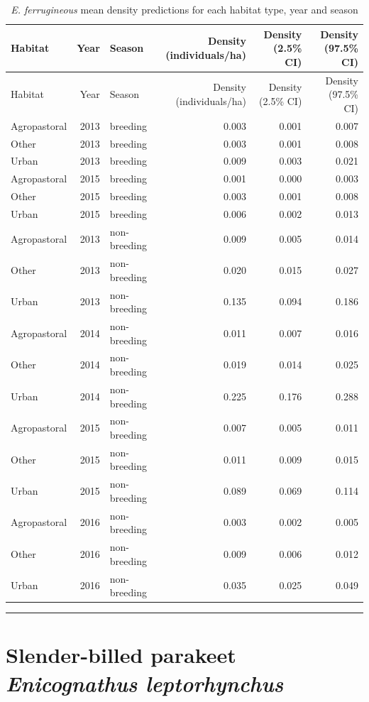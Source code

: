 \documentclass[]{article}
\begin{document}
\begin{longtable}[]{@{}lrlrrr@{}}
\caption{\textit{E. ferrugineous} mean density predictions for each
habitat type, year and season}\tabularnewline
\toprule
Habitat & Year & Season & Density (individuals/ha) & Density (2.5\% CI)
& Density (97.5\% CI)\tabularnewline
\midrule
\endfirsthead
\toprule
Habitat & Year & Season & Density (individuals/ha) & Density (2.5\% CI)
& Density (97.5\% CI)\tabularnewline
\midrule
\endhead
Agropastoral & 2013 & breeding & 0.003 & 0.001 & 0.007\tabularnewline
Other & 2013 & breeding & 0.003 & 0.001 & 0.008\tabularnewline
Urban & 2013 & breeding & 0.009 & 0.003 & 0.021\tabularnewline
Agropastoral & 2015 & breeding & 0.001 & 0.000 & 0.003\tabularnewline
Other & 2015 & breeding & 0.003 & 0.001 & 0.008\tabularnewline
Urban & 2015 & breeding & 0.006 & 0.002 & 0.013\tabularnewline
Agropastoral & 2013 & non-breeding & 0.009 & 0.005 &
0.014\tabularnewline
Other & 2013 & non-breeding & 0.020 & 0.015 & 0.027\tabularnewline
Urban & 2013 & non-breeding & 0.135 & 0.094 & 0.186\tabularnewline
Agropastoral & 2014 & non-breeding & 0.011 & 0.007 &
0.016\tabularnewline
Other & 2014 & non-breeding & 0.019 & 0.014 & 0.025\tabularnewline
Urban & 2014 & non-breeding & 0.225 & 0.176 & 0.288\tabularnewline
Agropastoral & 2015 & non-breeding & 0.007 & 0.005 &
0.011\tabularnewline
Other & 2015 & non-breeding & 0.011 & 0.009 & 0.015\tabularnewline
Urban & 2015 & non-breeding & 0.089 & 0.069 & 0.114\tabularnewline
Agropastoral & 2016 & non-breeding & 0.003 & 0.002 &
0.005\tabularnewline
Other & 2016 & non-breeding & 0.009 & 0.006 & 0.012\tabularnewline
Urban & 2016 & non-breeding & 0.035 & 0.025 & 0.049\tabularnewline
\bottomrule
\end{longtable}

\begin{center}\rule{0.5\linewidth}{\linethickness}\end{center}

\section{\texorpdfstring{Slender-billed parakeet \emph{Enicognathus
leptorhynchus}}{Slender-billed parakeet Enicognathus leptorhynchus}}\label{slender-billed-parakeet-enicognathus-leptorhynchus}
\end{document}
